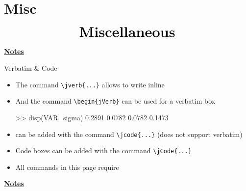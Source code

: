 \documentclass[10pt]{beamer}
\begin{document}
\section{Misc}
\begin{frame}
    \begin{eqnarray*}
        &\text{{\huge \textbf{Miscellaneous}}}\\
    \end{eqnarray*}
\end{frame}
\begin{flushleft}
    \underline{\textbf{Notes}}\setlength{\parskip}{.15cm}\notesize\newline\par
\end{flushleft}

\begin{frame}[fragile]
    {Verbatim \& Code}
    \begin{itemize}
        \item The command \texttt{\textbackslash jverb\{...\}} allows to write inline   
        \item And  the command \texttt{\textbackslash begin\{jVerb\}} can be used for a verbatim box  
        \begin{jVerb}
        >> disp(VAR_sigma)
        0.2891    0.0782
        0.0782    0.1473
        \end{jVerb}
        \item {} can be added with the command \texttt{\textbackslash jcode\{...\}} (does not support verbatim)  
        \item Code boxes can be added with the command \texttt{\textbackslash jCode\{...\}} 
        \item All commands in this page require \jverb{\begin{frame}[fragile]}
    \end{itemize}
\end{frame}
\begin{flushleft}
    \underline{\textbf{Notes}}\setlength{\parskip}{.15cm}\notesize\newline\par
\end{flushleft}
\end{document}
